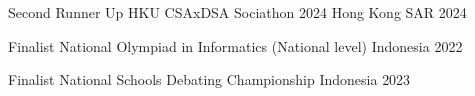 



\begin{cvhonors}

  \cvhonor
    {Second Runner Up} %
    {HKU CSAxDSA Sociathon 2024} %
    {Hong Kong SAR} %
    {2024} %

  \cvhonor
    {Finalist} %
    {National Olympiad in Informatics (National level)} %
    {Indonesia} %
    {2022} %

  \cvhonor
    {Finalist} %
    {National Schools Debating Championship} %
    {Indonesia} %
    {2023} %
\end{cvhonors}
